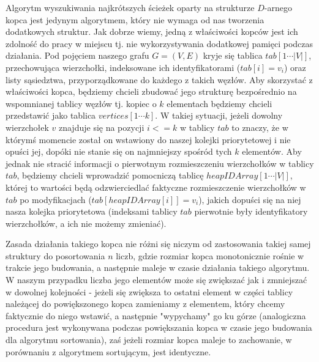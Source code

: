 Algorytm wyszukiwania najkrótszych ścieżek oparty na strukturze $D$-arnego kopca jest jedynym algorytmem, który nie wymaga od nas tworzenia dodatkowych struktur. Jak dobrze wiemy, jedną z właściwości kopców jest ich zdolność do pracy w miejscu tj. nie wykorzystywania dodatkowej pamięci podczas działania. Pod pojęciem naszego grafu $G = \left( V, E \right)$ kryje się tablica $tab \left[ 1 \cdots \left| V\right| \right]$, przechowująca wierzchołki, indeksowane ich identyfikatorami ($tab[i]=v_{i}$) oraz listy sąsiedztwa, przyporządkowane do każdego z takich węzłów. Aby skorzystać z właściwości kopca, będziemy chcieli zbudować jego strukturę bezpośrednio na wspomnianej tablicy węzłów tj. kopiec o $k$ elementach będziemy chcieli przedstawić jako tablica $vertices \left[ 1 \cdots k \right]$. W takiej sytuacji, jeżeli dowolny wierzchołek $v$ znajduje się na pozycji $i <= k $ w tablicy $tab$ to znaczy, że w którymś momencie został on wstawiony do naszej kolejki priorytetowej i nie opuści jej, dopóki nie stanie się on najmniejszy spośród tych $k$ elementów. Aby jednak nie stracić informacji o pierwotnym rozmieszczeniu wierzchołków w tablicy $tab$, będziemy chcieli wprowadzić pomocniczą tablicę $heapIDArray \left[ 1 \cdots \left| V\right| \right]$, której to wartości będą odzwierciedlać faktyczne rozmieszczenie wierzchołków w $tab$ po modyfikacjach ($tab \left[ heapIDArray \left[ i \right] \right] = v_{i}$), jakich dopuści się na niej nasza kolejka priorytetowa (indeksami tablicy $tab$ pierwotnie były identyfikatory wierzchołków, a ich nie możemy zmieniać).

Zasada działania takiego kopca nie różni się niczym od zastosowania takiej samej struktury do posortowania $n$ liczb, gdzie rozmiar kopca monotonicznie rośnie w trakcie jego budowania, a następnie maleje w czasie działania takiego algorytmu. W naszym przypadku liczba jego elementów może się zwiększać jak i zmniejszać w dowolnej kolejności - jeżeli się zwiększa to ostatni element w części tablicy należącej do powiększonego kopca zamieniamy z elementem, który chcemy faktycznie do niego wstawić, a następnie "wypychamy" go ku górze (analogiczna procedura jest wykonywana podczas powiększania kopca w czasie jego budowania dla algorytmu sortowania), zaś jeżeli rozmiar kopca maleje to zachowanie, w porównaniu z algorytmem sortującym, jest identyczne.

